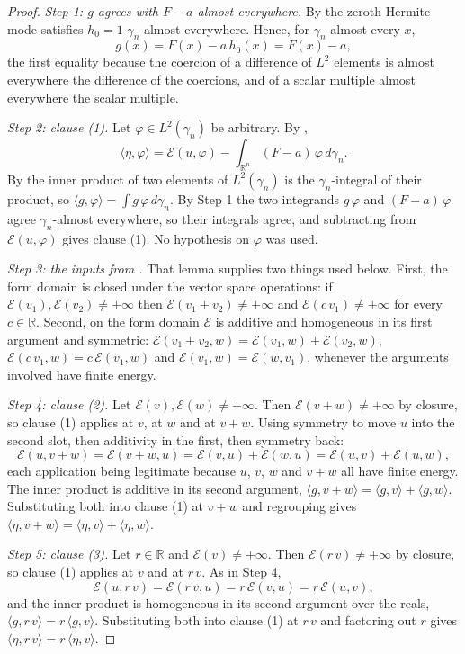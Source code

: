\begin{proof}
\emph{Step 1: $g$ agrees with $F - a$ almost everywhere.}
By  the zeroth Hermite mode satisfies $h_0 = 1$
$\gamma_n$-almost everywhere.  Hence, for $\gamma_n$-almost every $x$,
\[
  g(x) = F(x) - a\,h_0(x) = F(x) - a ,
\]
the first equality because the coercion of a difference of $L^2$ elements is
almost everywhere the difference of the coercions, and of a scalar multiple
almost everywhere the scalar multiple.

\emph{Step 2: clause (1).}
Let $\varphi \in L^2(\gamma_n)$ be arbitrary.  By ,
\[
  \langle \eta, \varphi\rangle
    = \mathcal{E}(u,\varphi) - \int_{\mathbb{R}^n} (F - a)\,\varphi \, d\gamma_n .
\]
By  the inner product of two elements of
$L^2(\gamma_n)$ is the $\gamma_n$-integral of their product, so
$\langle g, \varphi\rangle = \int g\,\varphi \, d\gamma_n$.  By Step 1 the two
integrands $g\,\varphi$ and $(F-a)\,\varphi$ agree $\gamma_n$-almost everywhere,
so their integrals agree, and subtracting from $\mathcal{E}(u,\varphi)$ gives
clause (1).  No hypothesis on $\varphi$ was used.

\emph{Step 3: the inputs from .}
That lemma supplies two things used below.  First, the form domain is closed under
the vector space operations: if $\mathcal{E}(v_1), \mathcal{E}(v_2) \neq +\infty$
then $\mathcal{E}(v_1 + v_2) \neq +\infty$ and $\mathcal{E}(c\,v_1) \neq +\infty$
for every $c \in \mathbb{R}$.  Second, on the form domain $\mathcal{E}$ is additive
and homogeneous in its first argument and symmetric:
$\mathcal{E}(v_1 + v_2, w) = \mathcal{E}(v_1,w) + \mathcal{E}(v_2,w)$,
$\mathcal{E}(c\,v_1, w) = c\,\mathcal{E}(v_1,w)$ and
$\mathcal{E}(v_1,w) = \mathcal{E}(w,v_1)$, whenever the arguments involved have
finite energy.

\emph{Step 4: clause (2).}
Let $\mathcal{E}(v), \mathcal{E}(w) \neq +\infty$.  Then
$\mathcal{E}(v+w) \neq +\infty$ by closure, so clause (1) applies at $v$, at $w$
and at $v+w$.  Using symmetry to move $u$ into the second slot, then additivity in
the first, then symmetry back:
\[
  \mathcal{E}(u, v+w) = \mathcal{E}(v+w, u) = \mathcal{E}(v,u) + \mathcal{E}(w,u)
    = \mathcal{E}(u,v) + \mathcal{E}(u,w),
\]
each application being legitimate because $u$, $v$, $w$ and $v+w$ all have finite
energy.  The inner product is additive in its second argument,
$\langle g, v+w\rangle = \langle g,v\rangle + \langle g,w\rangle$.  Substituting
both into clause (1) at $v+w$ and regrouping gives
$\langle \eta, v+w\rangle = \langle \eta, v\rangle + \langle \eta, w\rangle$.

\emph{Step 5: clause (3).}
Let $r \in \mathbb{R}$ and $\mathcal{E}(v) \neq +\infty$.  Then
$\mathcal{E}(r\,v) \neq +\infty$ by closure, so clause (1) applies at $v$ and at
$r\,v$.  As in Step 4,
\[
  \mathcal{E}(u, r\,v) = \mathcal{E}(r\,v, u) = r\,\mathcal{E}(v,u)
    = r\,\mathcal{E}(u,v),
\]
and the inner product is homogeneous in its second argument over the reals,
$\langle g, r\,v\rangle = r\,\langle g, v\rangle$.  Substituting both into clause
(1) at $r\,v$ and factoring out $r$ gives
$\langle \eta, r\,v\rangle = r\,\langle \eta, v\rangle$.
\end{proof}
